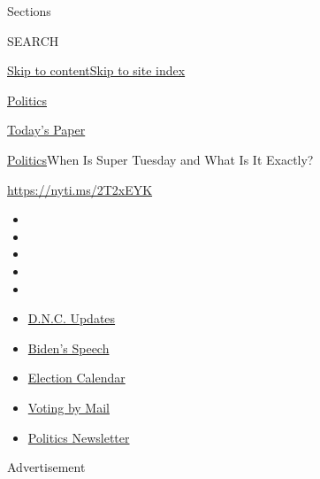 Sections

SEARCH

\protect\hyperlink{site-content}{Skip to
content}\protect\hyperlink{site-index}{Skip to site index}

\href{https://www.nytimes3xbfgragh.onion/section/politics}{Politics}

\href{https://myaccount.nytimes3xbfgragh.onion/auth/login?response_type=cookie\&client_id=vi}{}

\href{https://www.nytimes3xbfgragh.onion/section/todayspaper}{Today's
Paper}

\href{/section/politics}{Politics}\textbar{}When Is Super Tuesday and
What Is It Exactly?

\url{https://nyti.ms/2T2xEYK}

\begin{itemize}
\item
\item
\item
\item
\item
\end{itemize}

\begin{itemize}
\item
  \href{https://www.nytimes3xbfgragh.onion/live/2020/08/20/us/dnc-convention-election?action=click\&pgtype=Article\&state=default\&region=TOP_BANNER\&context=storylines_menu}{D.N.C.
  Updates}
\item
  \href{https://www.nytimes3xbfgragh.onion/2020/08/20/us/politics/biden-presidential-nomination-dnc.html?action=click\&pgtype=Article\&state=default\&region=TOP_BANNER\&context=storylines_menu}{Biden's
  Speech}
\item
  \href{https://www.nytimes3xbfgragh.onion/interactive/2019/us/elections/2020-presidential-election-calendar.html?action=click\&pgtype=Article\&state=default\&region=TOP_BANNER\&context=storylines_menu}{Election
  Calendar}
\item
  \href{https://www.nytimes3xbfgragh.onion/interactive/2020/08/11/us/politics/vote-by-mail-us-states.html?action=click\&pgtype=Article\&state=default\&region=TOP_BANNER\&context=storylines_menu}{Voting
  by Mail}
\item
  \href{https://www.nytimes3xbfgragh.onion/newsletters/politics?action=click\&pgtype=Article\&state=default\&region=TOP_BANNER\&context=storylines_menu}{Politics
  Newsletter}
\end{itemize}

Advertisement


